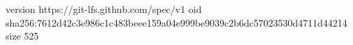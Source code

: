 version https://git-lfs.github.com/spec/v1
oid sha256:7612d42c3e986c1c483beee159a04e999be9039c2b6dc57023530d4711d44214
size 525

